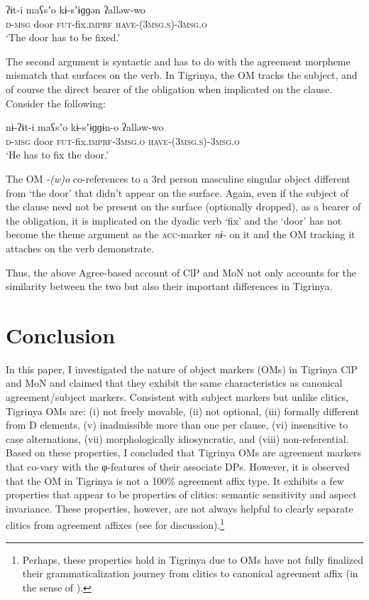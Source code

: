 \documentclass[output=paper]{langscibook}
\begin{document}
\ea\label{ex:Gebregziabher:obliged} 
\gll ʔɨt-i maʕsʼo kɨ-sʼɨɡɡən  ʔalləw-wo\\
{\scshape d-msg} door {\scshape fut-}fix.{\scshape imprf} {\scshape have-(3msg.s)-3msg.o}\\
\glt `The door has to be fixed.'  
\z 

The second argument is syntactic and has to do with the agreement morpheme mismatch that surfaces on the verb. In Tigrinya, the OM tracks the subject, and of course the direct bearer of the obligation when implicated on the clause. Consider the following:

\ea 
\gll nɨ-ʔɨt-i maʕsʼo kɨ-sʼɨɡɡɨn-o  ʔalləw-wo\\
{\scshape d-msg} door {\scshape fut-}fix.{\scshape imprf-3msg.o} {\scshape have-(3msg.s)-3msg.o}\\
\glt `He has to fix the door.'  
\z

\noindent The OM \emph{-(w)o} co-references to a 3rd person masculine singular object different from `the door' that didn't appear on the surface. Again, even if the subject of the clause need not be present on the surface (optionally dropped), as a bearer of the obligation, it is implicated on the dyadic verb `fix' and the `door' has not become the theme argument as the {\scshape acc}-marker \emph{nɨ-} on it and the OM tracking it attaches on the verb demonstrate.

Thus, the above Agree-based account of ClP and MoN not only accounts for the similarity between the two but also their important differences in Tigrinya.

\section{Conclusion}\label{sec:gebregziabher:7}

In this paper, I investigated the nature of object markers (OMs) in Tigrinya ClP and MoN and claimed that they exhibit the same characteristics as canonical agreement/subject markers. Consistent with subject markers but unlike clitics, Tigrinya OMs are: (i) not freely movable, (ii) not optional, (iii) formally different from D elements, (v) inadmissible more than one per clause, (vi) insensitive to case alternations, (vii) morphologically idiosyncratic, and (viii) non-referential. Based on these properties, I concluded that Tigrinya OMs are agreement markers that co-vary with the φ-features of their associate DPs. However, it is observed that the OM in Tigrinya is not a 100\% agreement affix type. It exhibits a few properties that appear to be properties of clitics: semantic sensitivity and aspect invariance. These properties, however, are not always helpful to clearly separate clitics from agreement affixes (see \citealt{harizanov14} for discussion).\footnote{Perhaps, these properties hold in Tigrinya due to OMs have not fully finalized their grammaticalization journey from clitics to canonical agreement affix (in the sense of \citealt{fub05}).}
\end{document}
